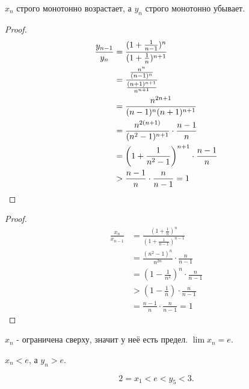 \documentclass[11pt, oneside]{article}   	%
\begin{document}
\begin{theorem}
    $x_n$ строго монотонно возрастает, а  $y_n$ строго монотонно убывает. 
    \begin{proof}
        \begin{equation*}
            \begin{split}
                \frac{y_{n-1}}{y_n} &= \frac{(1+\frac{1}{n-1})^{n}}{(1+\frac{1}{n})^{n+1}}\\
                &= \frac{\frac{n^{n}}{(n-1)^{n}}}{\frac{(n+1)^{n+1}}{n^{n+1}}}\\
                &= \frac{n^{2n+1}}{(n-1)^{n}(n+1)^{n+1}}\\ 
                &= \frac{n^{2(n+1)}}{(n^2-1)^{n+1}} \cdot \frac{n-1}{n}\\ 
                &= \left(1+\frac{1}{n^2-1}\right)^{n+1}\cdot \frac{n-1}{n}\\
                &> \frac{n-1}{n}\cdot \frac{n}{n-1} = 1 \qedhere 
            \end{split}
        \end{equation*}
    \end{proof} 
    \begin{proof}
        \begin{equation*}
            \begin{split}
                \frac{x_n}{x_{n-1}} &= \frac{\left( 1+\frac{1}{n} \right)^{n} }{\left( 1+\frac{1}{n-1} \right)^{n-1} }\\
                                    &= \frac{\left( n^2-1 \right)^{n} }{n^{2n}} \cdot  \frac{n}{n-1}\\
                                    &= \left( 1-\frac{1}{n^2} \right)^{n} \cdot  \frac{n}{n-1}\\ 
                                    &> \left( 1-\frac{1}{n} \right) \cdot \frac{n}{n-1}\\
                                    &= \frac{n-1}{n}\cdot \frac{n}{n-1} = 1
            \end{split}
        \end{equation*}
        
    \end{proof}
    $x_n$ - ограничена сверху, значит у неё есть предел. $\lim x_n = e$.
\end{theorem}
\begin{tlemma}
    $x_n < e$, а  $y_n>e$.
\end{tlemma}
\begin{tlemma}
    \[ 2 = x_1 < e < y_5 < 3 .\] 
\end{tlemma}
\end{document}
